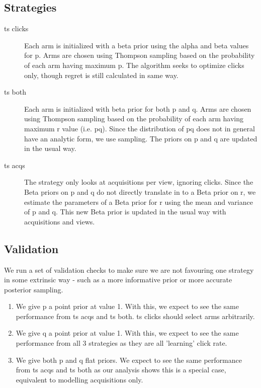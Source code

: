 \documentclass[12pt]{article}
\begin{document}
\subsection{Strategies}

\begin{description}
	\item[ts clicks] Each arm is initialized with a beta prior using the alpha and beta values for p. Arms are chosen using Thompson sampling based on the probability of each arm having maximum p. The algorithm seeks to optimize clicks only, though regret is still calculated in same way.
	\item[ts both] Each arm is initialized with beta prior for both p and q. Arms are chosen using Thompson sampling based on the probability of each arm having maximum r value (i.e. pq). Since the distribution of pq does not in general have an analytic form, we use sampling. The priors on p and q are updated in the usual way.
	\item[ts acqs] The strategy only looks at acquisitions per view, ignoring clicks. Since the Beta priors on p and q do not directly translate in to a Beta prior on r, we estimate the parameters of a Beta prior for r using the mean and variance of p and q. This new Beta prior is updated in the usual way with acquisitions and views.
\end{description}

\subsection{Validation}

We run a set of validation checks to make sure we are not favouring one strategy in some extrinsic way - such as a more informative prior or more accurate posterior sampling.

\begin{enumerate}
	\item  We give p a point prior at value 1. With this, we expect to see the same performance from ts acqs and ts both. ts clicks should select arms arbitrarily.
	\item  We give q a point prior at value 1. With this, we expect to see the same performance from all 3 strategies as they are all 'learning' click rate.
	\item  We give both p and q flat priors. We expect to see the same performance from ts acqs and ts both as our analysis shows this is a special case, equivalent to modelling acquisitions only.
\end{enumerate}
\end{document}

